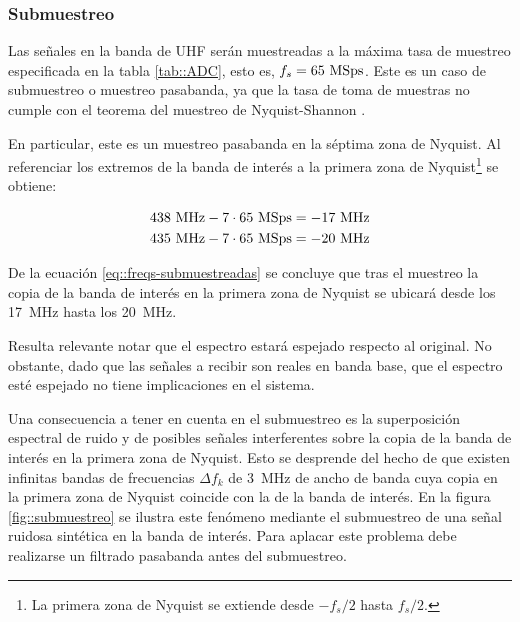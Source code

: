 \documentclass[../../main.tex]{subfiles}
\begin{document}

\subsubsection{Submuestreo}
Las señales en la banda de UHF serán muestreadas a la máxima tasa de muestreo especificada en la tabla \ref{tab::ADC}, esto es, $f_s = 65~\textrm{MSps}$. Este es un caso de submuestreo o muestreo pasabanda, ya que la tasa de toma de muestras no cumple con el teorema del muestreo de Nyquist-Shannon \cite{teorema-del-muestreo}.

En particular, este es un muestreo pasabanda en la séptima zona de Nyquist. Al referenciar los extremos de la banda de interés a la primera zona de Nyquist\footnote{La primera zona de Nyquist se extiende desde $-f_s/2$ hasta $f_s/2$.} se obtiene:

\begin{equation}
\!
\begin{aligned}
438~\textrm{MHz} - 7 \cdot 65~\textrm{MSps} = -17~\textrm{MHz} \\
435~\textrm{MHz} - 7 \cdot 65~\textrm{MSps} = -20~\textrm{MHz} 
\end{aligned}
\label{eq::freqs-submuestreadas}
\end{equation}

De la ecuación \ref{eq::freqs-submuestreadas} se concluye que tras el muestreo la copia de la banda de interés en la primera zona de Nyquist se ubicará desde los 17~MHz hasta los 20~MHz. 

Resulta relevante notar que el espectro estará espejado respecto al original. No obstante, dado que las señales a recibir son reales en banda base, que el espectro esté espejado no tiene implicaciones en el sistema. 

Una consecuencia a tener en cuenta en el submuestreo es la superposición espectral de ruido y de posibles señales interferentes sobre la copia de la banda de interés en la primera zona de Nyquist. Esto se desprende del hecho de que existen infinitas bandas de frecuencias $\Delta f_k$ de 3~MHz de ancho de banda cuya copia en la primera zona de Nyquist coincide con la de la banda de interés. 
En la figura \ref{fig::submuestreo} se ilustra este fenómeno mediante el submuestreo de una señal ruidosa sintética en la banda de interés. Para aplacar este problema debe realizarse un filtrado pasabanda antes del submuestreo.
\end{document}
